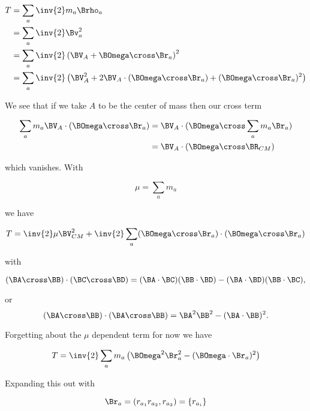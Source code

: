 \begin{align*}
T 
&= \sum_a \inv{2} m_a \Brho_a \\
&= \sum_a \inv{2} \Bv_a^2 \\
&= 
\sum_a \inv{2} \left(
\BV_A + \BOmega \cross \Br_a
\right)^2 \\
&=
\sum_a \inv{2} \left( \BV_A^2 +
2 \BV_A \cdot (\BOmega \cross \Br_a)
+ (\BOmega \cross \Br_a)^2
\right)
\end{align*}

We see that if we take $A$ to be the center of mass then our cross term

\begin{align*}
\sum_a m_a \BV_A \cdot (\BOmega \cross \Br_a)
&=
\BV_A \cdot (\BOmega \cross \sum_a m_a \Br_a) \\
&=
\BV_A \cdot (\BOmega \cross \BR_{CM} )
\end{align*}

which vanishes.  With 

\begin{equation}\label{eqn:rigidBodyMotion:380}
\mu = \sum_a m_a
\end{equation}

we have

\begin{equation}\label{eqn:rigidBodyMotion:400}
T = \inv{2} \mu \BV_{CM}^2+ \inv{2} \sum_a 
(\BOmega \cross \Br_a) \cdot (\BOmega \cross \Br_a) 
\end{equation}

with

\begin{equation}\label{eqn:rigidBodyMotion:420}
(\BA \cross \BB) \cdot (\BC \cross \BD) = (\BA \cdot \BC) (\BB \cdot \BD) -(\BA \cdot \BD) (\BB \cdot \BC),
\end{equation}

or
\begin{equation}\label{eqn:rigidBodyMotion:420b}
(\BA \cross \BB) \cdot (\BA \cross \BB) = \BA^2 \BB^2 - (\BA \cdot \BB)^2.
\end{equation}

Forgetting about the $\mu$ dependent term for now we have

\begin{equation}\label{eqn:rigidBodyMotion:440}
T = \inv{2} \sum_a m_a \left( \BOmega^2 \Br_a^2 - (\BOmega \cdot \Br_a)^2
\right)
\end{equation}

Expanding this out with 

\begin{equation}\label{eqn:rigidBodyMotion:460}
\Br_a = ( r_{a_1} r_{a_2}, r_{a_3} ) = \{ r_{a_i} \}
\end{equation}

